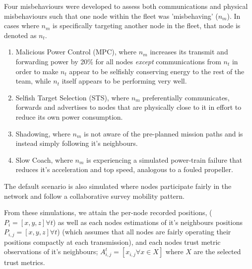 Four misbehaviours were developed to assess both communications and physical misbehaviours  such that one node within the fleet was 'misbehaving' ($n_m$). In cases where $n_m$ is specifically targeting another node in the fleet, that node is denoted as $n_t$.

\begin{enumerate}
	\item Malicious Power Control (MPC), where $n_m$ increases its transmit and forwarding power by 20\% for all nodes \emph{except} communications from $n_t$ in order to make $n_t$ appear to be selfishly conserving energy to the rest of the team, while $n_t$ itself appears to be performing very well.
	\item Selfish Target Selection (STS), where $n_m$ preferentially communicates, forwards and advertises to nodes that are physically close to it in effort to reduce its own power consumption.
	\item Shadowing, where $n_m$ is not aware of the pre-planned mission paths and is instead simply following it's neighbours. 
	\item Slow Coach, where $n_m$ is experiencing a simulated power-train failure that reduces it's acceleration and top speed, analogous to a fouled propeller. 
\end{enumerate}

The default scenario is also simulated where nodes participate fairly in the network and follow a collaborative survey mobility pattern.

From these simulations, we attain the per-node recorded positions, ($P_i = [x,y,z] \forall t$) as well as each nodes estimations of it's neighbours positions $P_{i,j} = [x,y,z] \forall t$) (which assumes that all nodes are fairly operating their positions compactly at each transmission), and each nodes trust metric observations of it's neighbours; $A_{i,j}^t = [ x_{i,j} \forall x \in X ] $ where $X$ are the selected trust metrics.

